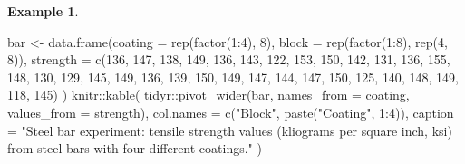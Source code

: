 \documentclass[
]{book}
\newenvironment{Shaded}{\begin{snugshade}}{\end{snugshade}}
\newcommand{\AttributeTok}[1]{\textcolor[rgb]{0.77,0.63,0.00}{#1}}
\newcommand{\DecValTok}[1]{\textcolor[rgb]{0.00,0.00,0.81}{#1}}
\newcommand{\FunctionTok}[1]{\textcolor[rgb]{0.00,0.00,0.00}{#1}}
\newcommand{\NormalTok}[1]{#1}
\newcommand{\OtherTok}[1]{\textcolor[rgb]{0.56,0.35,0.01}{#1}}
\newcommand{\SpecialCharTok}[1]{\textcolor[rgb]{0.00,0.00,0.00}{#1}}
\newcommand{\StringTok}[1]{\textcolor[rgb]{0.31,0.60,0.02}{#1}}
\theoremstyle{definition}
\theoremstyle{definition}
\newtheorem{example}{Example}[chapter]
\theoremstyle{definition}
\theoremstyle{definition}
\theoremstyle{remark}
\begin{document}
\begin{example}
\begin{Shaded}
\begin{Highlighting}[]
\NormalTok{bar }\OtherTok{\textless{}{-}} \FunctionTok{data.frame}\NormalTok{(}\AttributeTok{coating =} \FunctionTok{rep}\NormalTok{(}\FunctionTok{factor}\NormalTok{(}\DecValTok{1}\SpecialCharTok{:}\DecValTok{4}\NormalTok{), }\DecValTok{8}\NormalTok{),}
                   \AttributeTok{block =} \FunctionTok{rep}\NormalTok{(}\FunctionTok{factor}\NormalTok{(}\DecValTok{1}\SpecialCharTok{:}\DecValTok{8}\NormalTok{), }\FunctionTok{rep}\NormalTok{(}\DecValTok{4}\NormalTok{, }\DecValTok{8}\NormalTok{)), }
                   \AttributeTok{strength =} \FunctionTok{c}\NormalTok{(}\DecValTok{136}\NormalTok{, }\DecValTok{147}\NormalTok{, }\DecValTok{138}\NormalTok{, }\DecValTok{149}\NormalTok{, }\DecValTok{136}\NormalTok{, }\DecValTok{143}\NormalTok{, }\DecValTok{122}\NormalTok{, }\DecValTok{153}\NormalTok{, }\DecValTok{150}\NormalTok{, }\DecValTok{142}\NormalTok{, }\DecValTok{131}\NormalTok{, }\DecValTok{136}\NormalTok{,}
                                   \DecValTok{155}\NormalTok{, }\DecValTok{148}\NormalTok{, }\DecValTok{130}\NormalTok{, }\DecValTok{129}\NormalTok{, }\DecValTok{145}\NormalTok{, }\DecValTok{149}\NormalTok{, }\DecValTok{136}\NormalTok{, }\DecValTok{139}\NormalTok{, }\DecValTok{150}\NormalTok{, }\DecValTok{149}\NormalTok{, }\DecValTok{147}\NormalTok{, }\DecValTok{144}\NormalTok{,}
                                   \DecValTok{147}\NormalTok{, }\DecValTok{150}\NormalTok{, }\DecValTok{125}\NormalTok{, }\DecValTok{140}\NormalTok{, }\DecValTok{148}\NormalTok{, }\DecValTok{149}\NormalTok{, }\DecValTok{118}\NormalTok{, }\DecValTok{145}\NormalTok{)}
\NormalTok{                     )}
\NormalTok{knitr}\SpecialCharTok{::}\FunctionTok{kable}\NormalTok{(}
\NormalTok{ tidyr}\SpecialCharTok{::}\FunctionTok{pivot\_wider}\NormalTok{(bar, }\AttributeTok{names\_from =}\NormalTok{ coating, }\AttributeTok{values\_from =}\NormalTok{ strength),}
 \AttributeTok{col.names =} \FunctionTok{c}\NormalTok{(}\StringTok{"Block"}\NormalTok{, }\FunctionTok{paste}\NormalTok{(}\StringTok{"Coating"}\NormalTok{, }\DecValTok{1}\SpecialCharTok{:}\DecValTok{4}\NormalTok{)),}
 \AttributeTok{caption =} \StringTok{"Steel bar experiment: tensile strength values (kliograms per square inch, ksi) from steel bars with four different coatings."}
\NormalTok{)}
\end{Highlighting}
\end{Shaded}

\begin{table}


\end{table}
\end{example}
\end{document}
